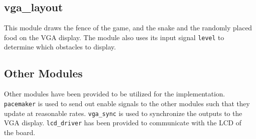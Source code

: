 \documentclass[paper=usletter, fontsize=12pt]{article}
\begin{document}
        \subsection{vga\_layout} This module draws the fence of the game, and
        the snake and the randomly placed food on the VGA display. The module
        also uses its input signal \texttt{level} to determine which obstacles
        to display.

        \subsection{Other Modules} Other modules have been provided to be
        utilized for the implementation. \texttt{pacemaker} is used to send out
        enable signals to the other modules such that they update at reasonable
        rates. \texttt{vga\_sync} is used to synchronize the outputs to the VGA
        display. \texttt{lcd\_driver} has been provided to communicate with the
        LCD of the board.
\end{document}
